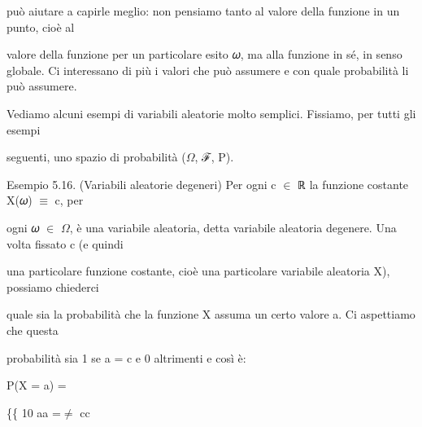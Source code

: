 \documentclass[a4paper,portrait,12pt]{article}
\begin{document}
\begin{flushleft}
pu\`{o} aiutare a capirle meglio: non pensiamo tanto al valore della funzione in un punto, cio\`{e} al
\end{flushleft}


\begin{flushleft}
valore della funzione per un particolare esito 𝜔, ma alla funzione in s\'{e}, in senso globale. Ci interessano di più i valori che pu\`{o} assumere e con quale probabilit\`{a} li pu\`{o} assumere.
\end{flushleft}


\begin{flushleft}
Vediamo alcuni esempi di variabili aleatorie molto semplici. Fissiamo, per tutti gli esempi
\end{flushleft}


\begin{flushleft}
seguenti, uno spazio di probabilit\`{a} ($\Omega$, ℱ, P).
\end{flushleft}


\begin{flushleft}
Esempio 5.16. (Variabili aleatorie degeneri) Per ogni c $\in$ ℝ la funzione costante X(𝜔) $\equiv$ c, per
\end{flushleft}


\begin{flushleft}
ogni 𝜔 $\in$ $\Omega$, \`{e} una variabile aleatoria, detta variabile aleatoria degenere. Una volta fissato c (e quindi
\end{flushleft}


\begin{flushleft}
una particolare funzione costante, cio\`{e} una particolare variabile aleatoria X), possiamo chiederci
\end{flushleft}


\begin{flushleft}
quale sia la probabilit\`{a} che la funzione X assuma un certo valore a. Ci aspettiamo che questa
\end{flushleft}


\begin{flushleft}
probabilit\`{a} sia 1 se a = c e 0 altrimenti e così \`{e}:
\end{flushleft}


\begin{flushleft}
P(X = a) =
\end{flushleft}





\begin{flushleft}
\{\{ 10 aa =$\neq$ cc
\end{flushleft}
\end{document}
